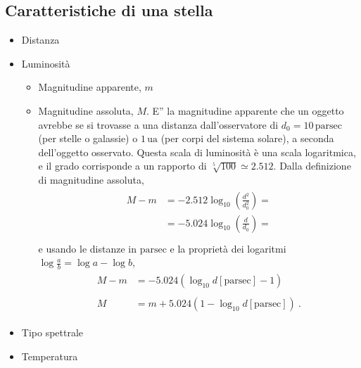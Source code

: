 \documentclass[letterpaper,10pt,italian]{jupyterBook}
\begin{document}
\subsection{Caratteristiche di una stella}
\label{\detokenize{ch/modern/astronomy-star-classification:caratteristiche-di-una-stella}}\begin{itemize}
\item {} 
\sphinxAtStartPar
Distanza

\item {} 
\sphinxAtStartPar
Luminosità
\begin{itemize}
\item {} 
\sphinxAtStartPar
Magnitudine apparente, \(m\)

\item {} 
\sphinxAtStartPar
Magnitudine assoluta, \(M\). E” la magnitudine apparente che un oggetto avrebbe se si trovasse a una distanza dall’osservatore di \(d_0 = 10 \, \text{parsec}\) (per stelle o galassie) o \(1 \, \text{ua}\) (per corpi del sistema solare), a seconda dell’oggetto osservato. Questa scala di luminosità è una scala logaritmica, e il grado corrisponde a un rapporto di \(\sqrt[5]{100} \simeq 2.512\). Dalla definizione di magnitudine assoluta,
\begin{equation*}
\begin{split}\begin{aligned}
        M - m 
        & = - 2.512 \log_{10}\left( \frac{d^2}{d_0^2}  \right) = \\
        & = - 5.024 \log_{10}\left( \frac{d}{d_0}  \right) = \\
     \end{aligned}\end{split}
\end{equation*}
\sphinxAtStartPar
e usando le distanze in \(\text{parsec}\) e la proprietà dei logaritmi \(\log \frac{a}{b} = \log a - \log b\),
\begin{equation*}
\begin{split}\begin{aligned}
       M - m & = - 5.024 \left( \log_{10} d[\text{parsec}] - 1 \right) \\ & \\
           M & = m + 5.024 \left( 1 - \log_{10} d[\text{parsec}] \right) \ .
     \end{aligned}\end{split}
\end{equation*}
\end{itemize}

\item {} 
\sphinxAtStartPar
Tipo spettrale

\item {} 
\sphinxAtStartPar
Temperatura

\end{itemize}
\end{document}

